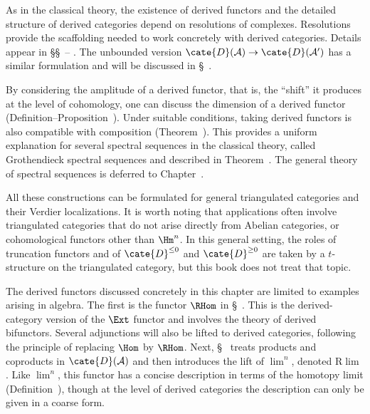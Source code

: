 As in the classical theory, the existence of derived functors and the
detailed structure of derived categories depend on resolutions of complexes.
Resolutions provide the scaffolding needed to work concretely with derived
categories. Details appear in
\S\S~--%
. The unbounded version
$\cate{D}(\mathcal{A})\to\cate{D}(\mathcal{A}')$ has a similar formulation
and will be discussed in
\S~.

By considering the amplitude of a derived functor, that is, the “shift” it
produces at the level of cohomology, one can discuss the dimension of a
derived functor
(Definition--Proposition~).
Under suitable conditions, taking derived functors is also compatible with
composition
(Theorem~). This
provides a uniform explanation for several spectral sequences in the
classical theory, called Grothendieck spectral sequences and described in
Theorem~. The general theory
of spectral sequences is deferred to
Chapter~.

All these constructions can be formulated for general triangulated categories
and their Verdier localizations. It is worth noting that applications often
involve triangulated categories that do not arise directly from Abelian
categories, or cohomological functors other than $\Hm^n$. In this general
setting, the roles of truncation functors and of
$\cate{D}^{\leq0}$ and $\cate{D}^{\geq0}$ are taken by a $t$-structure on
the triangulated category, but this book does not treat that topic.

The derived functors discussed concretely in this chapter are limited to
examples arising in algebra. The first is the functor $\RHom$ in
\S~. This is the derived-category version of
the $\Ext$ functor and involves the theory of derived bifunctors. Several
adjunctions will also be lifted to derived categories, following the principle
of replacing $\Hom$ by $\RHom$. Next,
\S~ treats products and coproducts in
$\cate{D}(\mathcal{A})$ and then introduces the lift of $\lim^n$, denoted
$\mathrm{R}\lim$. Like $\lim^n$, this functor has a concise description in
terms of the homotopy limit
(Definition~), though at the level of
derived categories the description can only be given in a coarse form.

